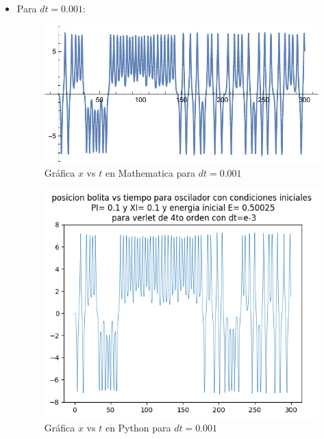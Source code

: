 \documentclass[idxtotoc,hyperref,openany]{labbook} %
\begin{document}
\begin{itemize}
\item Para $dt=0.001$:


\begin{figure}[H] %
\begin{center}
\includegraphics[width=1\linewidth]{discensopara0-001.pdf}
\end{center}
\caption{Gráfica $x$ vs $t$ en Mathematica para $dt=0.001$}
\label{graficamathematica1}
\end{figure}

\begin{figure}[H] %
\begin{center}
\includegraphics[width=1\linewidth]{0verlet_dt_0-001_x_vs_t_bolita.png}
\end{center}
\caption{Gráfica $x$ vs $t$ en Python para $dt=0.001$}
\label{graficapython1}
\end{figure}


\end{itemize}
\end{document}
